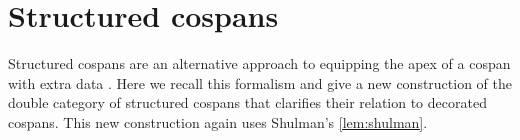 \documentclass[reqno]{amsart}
\theoremstyle{definition}
\theoremstyle{remark}
\newcommand{\A}{\mathsf{A}}
\newcommand{\inta}{\raisebox{.3\depth}{$\smallint\hspace{-.01in}$}}
\begin{document}
\iffalse
we have a natural isomorphism between $0_{\inta F'}$ and $G(0_{\inta F})$ given by:
\[
\begin{tikzpicture}[scale=1.5]
\node (A) at (-1,0.5) {$\scriptscriptstyle{1}$};
\node () at (4,0.66) {$\scriptscriptstyle{\cong}$};
\node (A1) at (0,0) {$\scriptscriptstyle{E(1)}$};
\node (A2) at (2,0) {$\scriptscriptstyle{E(F(0_\A))}$};
\node (A3) at (4,0) {$\scriptscriptstyle{E(F(0_\A))}$};
\node (A4) at (6,0) {$\scriptscriptstyle{F'(H(0_\A))}$};
\node (A') at (2,0.5) {$\scriptscriptstyle{F'(H(0_\A))}$};
\node (B1) at (0,1) {$\scriptscriptstyle{F'(0_{\A'})}$};
\node (B2) at (6,1) {$\scriptscriptstyle{F'(0_{\A'})}$};
\path[->,font=\scriptsize,>=angle 90]
(A) edge node [below] {$\scriptscriptstyle{E_0}$} (A1)
(A) edge node [above] {$\scriptscriptstyle{\phi_0'}$} (B1)
(A1) edge node [above] {$\scriptscriptstyle{E(\phi_0)}$} (A2)
(A2) edge node [below] {$\scriptscriptstyle{E(F(!_{0_\A}))}$} (A3)
(A3) edge node [below] {$\scriptscriptstyle{\theta_{0_\A}}$} (A4)
(A2) edge node [left] {$\scriptscriptstyle{\theta_{0_\A}}$} (A')
(B1) edge node [fill=white] {$\scriptscriptstyle{F'(H_0)}$} (A')
(A') edge node [fill=white] {$\scriptscriptstyle{F'(H(!_{0_\A}))}$} (A4)
(B2) edge node [right] {$\scriptscriptstyle{F'(H_0)}$} (A4)
(B1) edge node [above] {$\scriptscriptstyle{F'(!_{0_{\A'}})}$} (B2);
\end{tikzpicture}
\]
\fi

\section{Structured cospans} \label{Structured}

Structured cospans are an alternative approach to equipping the apex of a cospan with 
extra data \cite{BC}.    Here we recall this formalism and give a new construction of the double category of structured cospans that clarifies their relation to decorated cospans.   This new construction again uses Shulman's \cref{lem:shulman}.  
\end{document}
